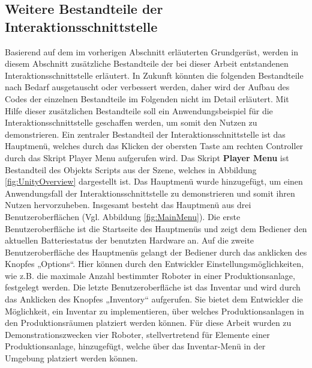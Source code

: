 \subsection{Weitere Bestandteile der Interaktionsschnittstelle}\label{sec:WeitereTeileInteraktion}
Basierend auf dem im vorherigen Abschnitt erläuterten Grundgerüst, werden in diesem Abschnitt zusätzliche Bestandteile der bei dieser Arbeit entstandenen Interaktionsschnittstelle erläutert. In Zukunft könnten die folgenden Bestandteile nach Bedarf ausgetauscht oder verbessert werden, daher wird der Aufbau des Codes der einzelnen Bestandteile im Folgenden nicht im Detail erläutert. Mit Hilfe dieser zusätzlichen Bestandteile soll ein Anwendungsbeispiel für die Interaktionsschnittstelle geschaffen werden, um somit den Nutzen zu demonstrieren.
\newline\newline
Ein zentraler Bestandteil der Interaktionsschnittstelle ist das Hauptmenü, welches durch das Klicken der obersten Taste am rechten Controller durch das Skript Player Menu aufgerufen wird. Das Skript \textbf{Player Menu} ist Bestandteil des Objekts Scripts aus der Szene, welches in Abbildung \ref{fig:UnityOverview} dargestellt ist. Das Hauptmenü wurde hinzugefügt, um einen Anwendungsfall der Interaktionsschnittstelle zu demonstrieren und somit ihren Nutzen hervorzuheben. Insgesamt besteht das Hauptmenü aus drei Benutzeroberflächen (Vgl. Abbildung \ref{fig:MainMenu}). Die erste Benutzeroberfläche ist die Startseite des Hauptmenüs und zeigt dem Bediener den aktuellen Batteriestatus der benutzten Hardware an. Auf die zweite Benutzeroberfläche des Hauptmenüs gelangt der Bediener durch das anklicken des Knopfes „Options“. Hier können durch den Entwickler Einstellungsmöglichkeiten, wie z.B. die maximale Anzahl bestimmter Roboter in einer Produktionsanlage, festgelegt werden. Die letzte Benutzeroberfläche ist das Inventar und wird durch das Anklicken des Knopfes „Inventory“ aufgerufen. Sie bietet dem Entwickler die Möglichkeit, ein Inventar zu implementieren, über welches Produktionsanlagen in den Produktionsräumen platziert werden können. Für diese Arbeit wurden zu Demonstrationszwecken vier Roboter, stellvertretend für Elemente einer Produktionsanlage, hinzugefügt, welche über das Inventar-Menü in der Umgebung platziert werden können.
